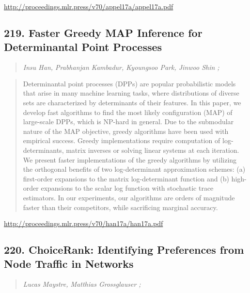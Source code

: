 \documentclass{article}
\begin{document}
\href{http://proceedings.mlr.press/v70/appel17a/appel17a.pdf}{http://proceedings.mlr.press/v70/appel17a/appel17a.pdf}

\subsection{219. Faster Greedy MAP Inference for Determinantal Point Processes}

\begin{quote}
\footnotesize{\textit{Insu Han, Prabhanjan Kambadur, Kyoungsoo Park, Jinwoo Shin ;}}
\end{quote}

\begin{quote}
    Determinantal point processes (DPPs) are popular probabilistic models that arise in many machine learning tasks, where distributions of diverse sets are characterized by determinants of their features. In this paper, we develop fast algorithms to find the most likely configuration (MAP) of large-scale DPPs, which is NP-hard in general. Due to the submodular nature of the MAP objective, greedy algorithms have been used with empirical success. Greedy implementations require computation of log-determinants, matrix inverses or solving linear systems at each iteration. We present faster implementations of the greedy algorithms by utilizing the orthogonal benefits of two log-determinant approximation schemes: (a) first-order expansions to the matrix log-determinant function and (b) high-order expansions to the scalar log function with stochastic trace estimators. In our experiments, our algorithms are orders of magnitude faster than their competitors, while sacrificing marginal accuracy.  \end{quote}

\href{http://proceedings.mlr.press/v70/han17a/han17a.pdf}{http://proceedings.mlr.press/v70/han17a/han17a.pdf}

\subsection{220. ChoiceRank: Identifying Preferences from Node Traffic in Networks}

\begin{quote}
\footnotesize{\textit{Lucas Maystre, Matthias Grossglauser ;}}
\end{quote}
\end{document}
